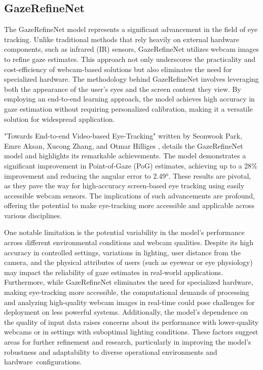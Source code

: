 \documentclass[conference]{IEEEtran}
\begin{document}
\subsection{GazeRefineNet}

The GazeRefineNet \cite{grn1} model represents a significant advancement in the field of eye tracking. Unlike traditional methods that rely heavily on external hardware components, such as infrared (IR) sensors, GazeRefineNet utilizes webcam images to refine gaze estimates. This approach not only underscores the practicality and cost-efficiency of webcam-based solutions but also eliminates the need for specialized hardware. The methodology behind GazeRefineNet involves leveraging both the appearance of the user’s eyes and the screen content they view. By employing an end-to-end learning approach, the model achieves high accuracy in gaze estimation without requiring personalized calibration, making it a versatile solution for widespread application. 

"Towards End-to-end Video-based Eye-Tracking" written by Seonwook Park, Emre Aksan, Xucong Zhang, and Otmar Hilliges \cite{grn1}, details the GazeRefineNet model and highlights its remarkable achievements. The model demonstrates a significant improvement in Point-of-Gaze (PoG) estimates, achieving up to a 28\% improvement and reducing the angular error to 2.49°. These results are pivotal, as they pave the way for high-accuracy screen-based eye tracking using easily accessible webcam sensors. The implications of such advancements are profound, offering the potential to make eye-tracking more accessible and applicable across various disciplines.

One notable limitation is the potential variability in the model's performance across different environmental conditions and webcam qualities. Despite its high accuracy in controlled settings, variations in lighting, user distance from the camera, and the physical attributes of users (such as eyewear or eye physiology) may impact the reliability of gaze estimates in real-world applications. Furthermore, while GazeRefineNet eliminates the need for specialized hardware, making eye-tracking more accessible, the computational demands of processing and analyzing high-quality webcam images in real-time could pose challenges for deployment on less powerful systems. Additionally, the model's dependence on the quality of input data raises concerns about its performance with lower-quality webcams or in settings with suboptimal lighting conditions. These factors suggest areas for further refinement and research, particularly in improving the model's robustness and adaptability to diverse operational environments and hardware configurations.
\end{document}
